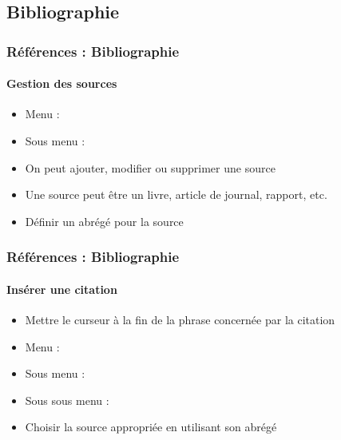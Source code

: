 \documentclass[xcolor=table]{beamer}
\begin{document}
\subsection{Bibliographie}

\begin{frame}[t]
\frametitle{Références : Bibliographie}
\framesubtitle{Gestion des sources}

\begin{minipage}{0.29\textwidth}
	\begin{itemize}
		\item Menu : 
		\item Sous menu : 
		\item On peut ajouter, modifier ou supprimer une source  
		\item Une source peut être un livre, article de journal, rapport, etc.
		\item Définir un abrégé pour la source
	\end{itemize}
\end{minipage}
\begin{minipage}{0.70\textwidth}	
\end{minipage}

\end{frame}

\begin{frame}[t]
\frametitle{Références : Bibliographie}
\framesubtitle{Insérer une citation}

\begin{minipage}{0.68\textwidth}
\begin{itemize}
	\item Mettre le curseur à la fin de la phrase concernée par la citation
	\item Menu : 
	\item Sous menu : 
	\item Sous sous menu : 
	\item Choisir la source appropriée en utilisant son abrégé
\end{itemize}
\end{minipage}
\begin{minipage}{0.30\textwidth}
\end{minipage}

\end{frame}
\end{document}
